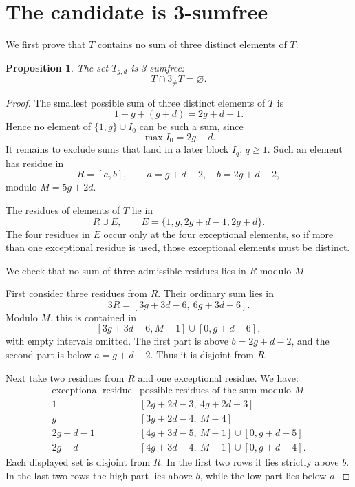 \documentclass[11pt]{article}
\newtheorem{proposition}[theorem]{Proposition}
\begin{document}
\section{The candidate is 3-sumfree}

We first prove that \(T\) contains no sum of three distinct elements of \(T\).

\begin{proposition}
The set \(T_{g,d}\) is 3-sumfree:
\[
T\cap 3_{\neq}T=\varnothing.
\]
\end{proposition}

\begin{proof}
The smallest possible sum of three distinct elements of \(T\) is
\[
1+g+(g+d)=2g+d+1.
\]
Hence no element of \(\{1,g\}\cup I_0\) can be such a sum, since
\[
\max I_0=2g+d.
\]
It remains to exclude sums that land in a later block \(I_q\), \(q\geq 1\). Such an element has residue in
\[
R=[a,b],
\qquad
a=g+d-2,\quad b=2g+d-2,
\]
modulo \(M=5g+2d\).

The residues of elements of \(T\) lie in
\[
R\cup E,
\qquad
E=\{1,g,2g+d-1,2g+d\}.
\]
The four residues in \(E\) occur only at the four exceptional elements, so if more than one exceptional residue is used, those exceptional elements must be distinct.

We check that no sum of three admissible residues lies in \(R\) modulo \(M\).

First consider three residues from \(R\). Their ordinary sum lies in
\[
3R=[3g+3d-6,\ 6g+3d-6].
\]
Modulo \(M\), this is contained in
\[
[3g+3d-6,M-1]\cup [0,g+d-6],
\]
with empty intervals omitted. The first part is above \(b=2g+d-2\), and the second part is below \(a=g+d-2\). Thus it is disjoint from \(R\).

Next take two residues from \(R\) and one exceptional residue. We have:
\[
\begin{array}{c|c}
\text{exceptional residue} & \text{possible residues of the sum modulo }M\\ \hline
1 & [2g+2d-3,\ 4g+2d-3]\\
g & [3g+2d-4,\ M-4]\\
2g+d-1 & [4g+3d-5,\ M-1]\cup[0,g+d-5]\\
2g+d & [4g+3d-4,\ M-1]\cup[0,g+d-4].
\end{array}
\]
Each displayed set is disjoint from \(R\). In the first two rows it lies strictly above \(b\). In the last two rows the high part lies above \(b\), while the low part lies below \(a\).


\end{proof}
\end{document}
